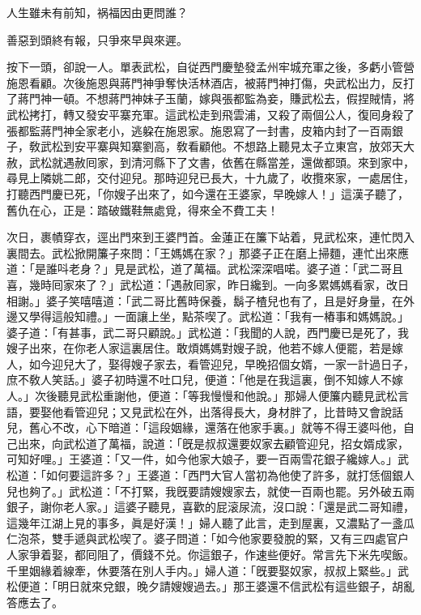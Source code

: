 \begin{myquote}
人生雖未有前知，祸福因由更問誰？

善惡到頭終有報，只爭來早與來遲。
\end{myquote}

按下一頭，卻說一人。單表武松，自従西門慶墊發孟州牢城充軍之後，多虧小管營施恩看顧。次後施恩與蔣門神爭奪快活林酒店，被蔣門神打傷，央武松出力，反打了蔣門神一頓。不想蔣門神妹子玉蘭，嫁與張都監為妾，賺武松去，假捏賊情，將武松拷打，轉又發安平寨充軍。這武松走到飛雲浦，又殺了兩個公人，復囘身殺了張都監蔣門神全家老小，逃躱在施恩家。施恩寫了一封書，皮箱内封了一百兩銀子，敎武松到安平寨與知寨劉高，敎看顧他。不想路上聽見太子立東宫，放郊天大赦，武松就遇赦囘家，到清河縣下了文書，依舊在縣當差，還做都頭。來到家中，尋見上隣姚二郎，交付迎兒。那時迎兒已長大，十九歲了，收攬來家，一處居住，打聽西門慶已死，「你嫂子出來了，如今還在王婆家，早晚嫁人！」這漢子聽了，舊仇在心，正是：踏破鐵鞋無處覓，得來全不費工夫！

次日，裹幘穿衣，逕出門來到王婆門首。金蓮正在簾下站着，見武松來，連忙閃入裏間去。武松掀開簾子來問：「王媽媽在家？」那婆子正在磨上掃麵，連忙出來應道：「是誰呌老身？」見是武松，道了萬福。武松深深唱喏。婆子道：「武二哥且喜，幾時囘家來了？」武松道：「遇赦囘家，昨日纔到。一向多累媽媽看家，改日相謝。」婆子笑嘻嘻道：「武二哥比舊時保養，鬍子楂兒也有了，且是好身量，在外邊又學得這般知禮。」一面讓上坐，點茶喫了。武松道：「我有一樁事和媽媽說。」婆子道：「有甚事，武二哥只顧說。」武松道：「我聞的人說，西門慶已是死了，我嫂子出來，在你老人家這裏居住。敢煩媽媽對嫂子說，他若不嫁人便罷，若是嫁人，如今迎兒大了，娶得嫂子家去，看管迎兒，早晚招個女婿，一家一計過日子，庶不敎人笑話。」婆子初時還不吐口兒，便道：「他是在我這裏，倒不知嫁人不嫁人。」次後聽見武松重謝他，便道：「等我慢慢和他說。」那婦人便簾内聽見武松言語，要娶他看管迎兒；又見武松在外，出落得長大，身材胖了，比昔時又會說話兒，舊心不改，心下暗道：「這段姻緣，還落在他家手裏。」就等不得王婆呌他，自己出來，向武松道了萬福，說道：「旣是叔叔還要奴家去顧管迎兒，招女婿成家，可知好哩。」王婆道：「又一件，如今他家大娘子，要一百兩雪花銀子纔嫁人。」武松道：「如何要這許多？」王婆道：「西門大官人當初為他使了許多，就打恁個銀人兒也夠了。」武松道：「不打緊，我旣要請嫂嫂家去，就使一百兩也罷。另外破五兩銀子，謝你老人家。」這婆子聽見，喜歡的屁滚尿流，沒口說：「還是武二哥知禮，這幾年江湖上見的事多，眞是好漢！」婦人聽了此言，走到屋裏，又濃點了一盞瓜仁泡茶，雙手遞與武松喫了。婆子問道：「如今他家要發脫的緊，又有三四處官户人家爭着娶，都囘阻了，價錢不兑。你這銀子，作速些便好。常言先下米先喫飯。千里姻緣着線牽，休要落在別人手内。」婦人道：「旣要娶奴家，叔叔上緊些。」武松便道：「明日就來兌銀，晚夕請嫂嫂過去。」那王婆還不信武松有這些銀子，胡亂答應去了。

